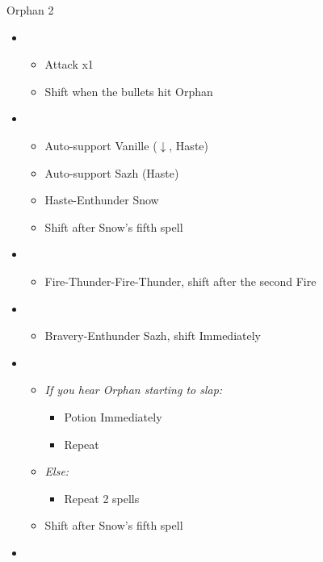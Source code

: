 \begin{battle}[1:05]{Orphan 2}
	\begin{multicols}{2}
		\begin{itemize}
			\item \second
			      \begin{itemize}
				      \item Attack x1
				      \item Shift when the bullets hit Orphan
			      \end{itemize}
			\item \fourth
			      \begin{itemize}
				      \item Auto-support Vanille ($\downarrow$, Haste)
				      \item Auto-support Sazh (Haste)
				      \item Haste-Enthunder Snow
				      \item Shift after Snow's fifth spell
			      \end{itemize}
			\item \sixth
			      \begin{itemize}
				      \item Fire-Thunder-Fire-Thunder, shift after the second Fire
			      \end{itemize}
			\item \fourth
			      \begin{itemize}
				      \item Bravery-Enthunder Sazh, shift Immediately
			      \end{itemize}
			      \columnbreak
			\item \sixth
			      \begin{itemize}
				      \item \textit{If you hear Orphan starting to slap:}
				      \begin{itemize}
					\item Potion Immediately
				      	\item Repeat
				      \end{itemize}
				      \item \textit{Else:}
				      \begin{itemize}
					\item Repeat 2 spells
				      \end{itemize}
				      \item Shift after Snow's fifth spell
			      \end{itemize}
			\item \fifth

\end{itemize}
\end{multicols}
\end{battle}

